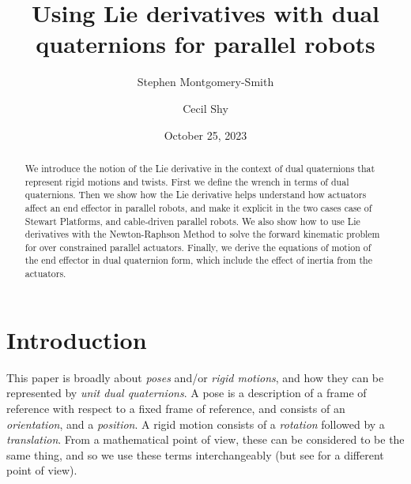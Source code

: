 \documentclass[reqno,12pt]{amsart}
\makeatletter
\def\blfootnote{\gdef\@thefnmark{}\@footnotetext}
\makeatother
\begin{document}
\title[Lie derivatives with dual quaternions]{Using Lie derivatives with dual quaternions for parallel robots}

\author{Stephen Montgomery-Smith}
\address{Department of Mathematics, University of Missouri, Columbia, MO 65211.\\
\rm\url{stephen@missouri.edu}\\
\rm\url{https://stephenmontgomerysmith.github.io}}

\author{Cecil Shy}
\address{Johnson Space Center, 2101 E.~NASA Parkway, Houston, TX 77058.\\
\rm\url{cecil.shy-1@nasa.gov}}


\date{October 25, 2023}

\begin{abstract}
We introduce the notion of the Lie derivative in the context of dual quaternions that represent rigid motions and twists.  First we define the wrench in terms of dual quaternions.  Then we show how the Lie derivative helps understand how actuators affect an end effector in parallel robots, and make it explicit in the two cases case of Stewart Platforms, and cable-driven parallel robots.  We also show how to use Lie derivatives with the Newton-Raphson Method to solve the forward kinematic problem for over constrained parallel actuators.  Finally, we derive the equations of motion of the end effector in dual quaternion form, which include the effect of inertia from the actuators.
\end{abstract}

\maketitle


\section{Introduction}

This paper is broadly about \emph{poses} and/or \emph{rigid motions}, and how they can be represented by \emph{unit dual quaternions}.  A pose is a description of a frame of reference with respect to a fixed frame of reference, and consists of an \emph{orientation}, and a \emph{position}.  A rigid motion consists of a \emph{rotation} followed by a \emph{translation}.  From a mathematical point of view, these can be considered to be the same thing, and so we use these terms interchangeably (but see \cite{chirikjian-et-al} for a different point of view).
\end{document}
